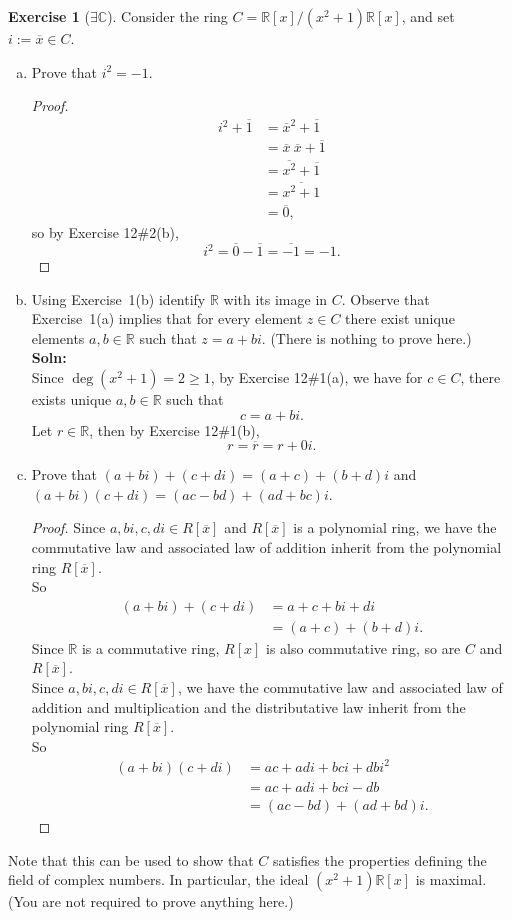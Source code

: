 \documentclass{amsart}
\newcommand{\bbr}{\mathbb{R}}
\newcommand{\bbc}{\mathbb{C}}
\theoremstyle{plain}
\theoremstyle{definition}
\newtheorem{exer}[lem]{Exercise}
\begin{document}
\begin{exer}[$\exists\bbc$]
Consider the ring $C=\bbr[x]/(x^2+1)\bbr[x]$, and set $i:=\overline x\in C$.
\begin{enumerate}[(a)]
\item 
Prove that 
$i^2=-1$.
\begin{proof}
  \begin{align*}
  	i^2+\overline{1} &=\overline{x}^2+\overline{1}\\
&= \overline{x}~\overline{x}+\overline{1}\\
&=\overline{x^2}+\overline{1}\\
&=\overline{x^2+1}\\
&=\overline{0},
  \end{align*}
  so by Exercise 12$\#$2(b),
  \[i^2 = \overline{0} - \overline{1} = \overline{-1} = -1.\]
\end{proof}
\item 
Using Exercise~1(b) identify $\bbr$ with its image in $C$.
Observe that Exercise~1(a) implies that for every element $z\in C$ there exist unique elements $a,b\in \bbr$
such that $z=a+bi$. (There is nothing to prove here.)\\
\textbf{Soln:}\\
Since $\deg(x^2 +1)  = 2 \geq 1$, by Exercise 12$\#$1(a), we have for $c \in C$, there exists unique $a,b \in \bbr$ such that 
\[c = a+bi.\]
Let $r \in \bbr$, then by Exercise 12$\#$1(b),
  \[r = \overline{r}  = r + 0i.\]
\item 
Prove that $(a+bi)+(c+di)=(a+c)+(b+d)i$ and $(a+bi)(c+di)=(ac-bd)+(ad+bc)i$.
\begin{proof}
  Since $a, bi,c,di \in R[\overline{x}]$ and $R[\overline{x}]$ is a polynomial ring, we have the commutative law and associated law of addition inherit from the polynomial ring $R[\overline{x}]$.\\
	So 
  \begin{align*}
  	(a+bi)+(c+di) &= a+c+bi+di\\
  				  &=(a+c)+(b+d)i. 
  \end{align*}
  Since $\bbr$ is a commutative ring, $R[x]$ is also commutative ring, so are $C$ and $R[\overline{x}]$.\\
  Since $a, bi,c,di \in R[\overline{x}]$, we have the commutative law and associated law of addition and multiplication and the distributative law inherit from the polynomial ring $R[\overline{x}]$.\\
  So 
  \begin{align*}
  	(a+bi)(c+di) &=ac + adi +bci+dbi^2 \\
  				 &=ac + adi +bci-db\\
  				 &=(ac-bd)+(ad+bd)i.
  \end{align*}
	

\end{proof}
\end{enumerate}
Note that this can be used to show that $C$ satisfies the properties defining the field of complex numbers.
In particular, the ideal $(x^2+1)\bbr[x]$ is maximal.
(You are not required to prove anything here.)
\end{exer}
\end{document}
